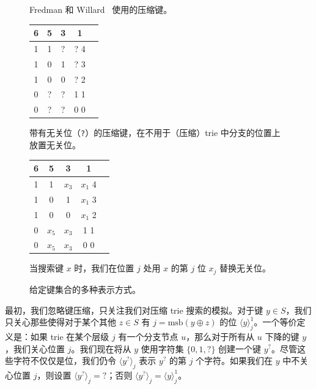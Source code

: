 \documentclass[11pt,a4paper]{ctexart}
\newcommand{\tto}{\text{0}}
\newcommand{\ttl}{\text{1}}
\newcommand{\ttq}{\text{?}}
\newcommand{\lpiece}[3]{\langle #1 \rangle_{#2}^{#3}}
\newcommand{\lpieceq}[2]{\langle #1 \rangle_{#2}}
\newcommand{\XOR}{\oplus}
\newcommand{\MSB}{\text{msb}}
\begin{document}
\begin{figure}[htbp]
\begin{center}
\medskip
Fredman 和 Willard~\cite{fredman93fusion} 使用的压缩键。

\bigskip

\begin{tabular}{*{5}{c}}
6 & 5 & 3 & 1 \\ \hline
1 & 1 & ? & ? \hspace{2em} 4\\
1 & 0 & 1 & ? \hspace{2em} 3\\
1 & 0 & 0 & ? \hspace{2em} 2\\
0 & ? & ? & 1 \hspace{2em} 1\\
0 & ? & ? & 0 \hspace{2em} 0
\end{tabular}

\medskip
带有无关位（\texttt{?}）的压缩键，在不用于（压缩）trie 中分支的位置上放置无关位。

\bigskip

\begin{tabular}{*{5}{c}}
6 & 5 & 3 & 1 \\ \hline
1 & 1 & $x_3$ & $x_1$ \hspace{2em} 4\\
1 & 0 & 1 & $x_1$ \hspace{2em} 3\\
1 & 0 & 0 & $x_1$ \hspace{2em} 2\\
0 & $x_5$ & $x_3$ & 1 \hspace{2em} 1\\
0 & $x_5$ & $x_3$ & 0 \hspace{2em} 0
\end{tabular}

\medskip
当搜索键 $x$ 时，我们在位置 $j$ 处用 $x$ 的第 $j$ 位 $x_j$ 替换无关位。
\end{center}
\caption{给定键集合的多种表示方式。}\label{fig:representation}
\end{figure}

最初，我们忽略键压缩，只关注我们对压缩 trie 搜索的模拟。对于键 $y \in S$，我们只关心那些使得对于某个其他 $z \in S$ 有 $j = \MSB(y \XOR z)$ 的位 $\lpiece{y}{j}{1}$。一个等价定义是：如果 trie 在某个层级 $j$ 有一个分支节点 $u$，那么对于所有从 $u$ 下降的键 $y$，我们关心位置 $j$。我们现在将从 $y$ 使用字符集 $\{\tto, \ttl, \ttq\}$ 创建一个键 $y^{\ttq}$。尽管这些字符不仅仅是位，我们仍令 $\lpieceq{y^{\ttq}}{j}$ 表示 $y^{\ttq}$ 的第 $j$ 个字符。如果我们在 $y$ 中不关心位置 $j$，则设置 $\lpieceq{y^{\ttq}}{j} = \ttq$；否则 $\lpieceq{y^{\ttq}}{j} = \lpiece{y}{j}{1}$。
\end{document}
